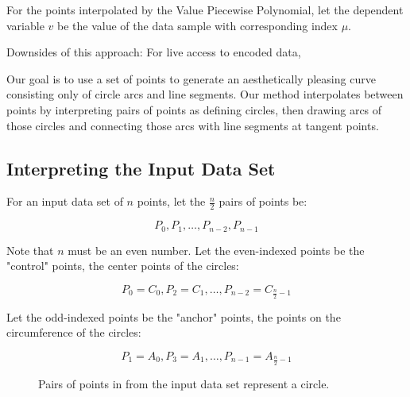 \documentclass{article}
\begin{document}
For the points interpolated by the Value Piecewise Polynomial, let the dependent variable \(v\) be the value of the data sample with corresponding index $\mu$.

Downsides of this approach:
For live access to encoded data, 




Our goal is to use a set of points to generate an aesthetically pleasing curve consisting only of circle arcs and line segments. Our method interpolates between points by interpreting pairs of points as defining circles, then drawing arcs of those circles and connecting those arcs with line segments at tangent points.

\newpage
\newpage
\mbox{} %


\subsection{Interpreting the Input Data Set}
For an input data set of \( n \) points, let the \( \frac{n}{2} \) pairs of points be:

\[ P_0, P_1, \ldots, P_{n-2}, P_{n-1} \]

Note that \( n \) must be an even number. Let the even-indexed points be the "control" points, the center points of the circles:

\[ P_0 = C_0, P_2 = C_1, \ldots, P_{n-2} = C_{\frac{n}{2}-1} \]

Let the odd-indexed points be the "anchor" points, the points on the circumference of the circles:

\[ P_1 = A_0, P_3 = A_1, \ldots, P_{n-1} = A_{\frac{n}{2}-1} \]


\begin{figure}[!h]
\centering
{}
\caption{Pairs of points in from the input data set represent a circle.}
\label{fig:pairs_of_points_define_a_circle}
\end{figure}
\end{document}
